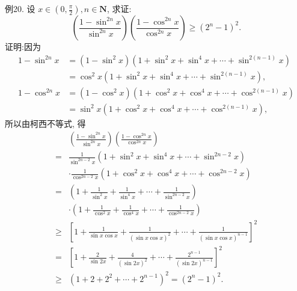 例20. 设 $x \in\left(0, \frac{\pi}{2}\right), n \in \mathbf{N}$, 求证:
$$
\left(\frac{1-\sin ^{2 n} x}{\sin ^{2 n} x}\right)\left(\frac{1-\cos ^{2 n} x}{\cos ^{2 n} x}\right) \geqslant\left(2^n-1\right)^2 .
$$
证明:因为
$$
\begin{aligned}
1-\sin ^{2 n} x & =\left(1-\sin ^2 x\right)\left(1+\sin ^2 x+\sin ^4 x+\cdots+\sin ^{2(n-1)} x\right) \\
& =\cos ^2 x\left(1+\sin ^2 x+\sin ^4 x+\cdots+\sin ^{2(n-1)} x\right), \\
1-\cos ^{2 n} x & =\left(1-\cos ^2 x\right)\left(1+\cos ^2 x+\cos ^4 x+\cdots+\cos ^{2(n-1)} x\right) \\
& =\sin ^2 x\left(1+\cos ^2 x+\cos ^4 x+\cdots+\cos ^{2(n-1)} x\right),
\end{aligned}
$$
所以由柯西不等式, 得
$$
\begin{aligned}
& \left(\frac{1-\sin ^{2 n} x}{\sin ^{2 n} x}\right)\left(\frac{1-\cos ^{2 n} x}{\cos ^{2 n} x}\right) \\
= & \frac{1}{\sin ^{2 n-2} x}\left(1+\sin ^2 x+\sin ^4 x+\cdots+\sin ^{2 n-2} x\right) \\
& \cdot \frac{1}{\cos ^{2 n-2} x}\left(1+\cos ^2 x+\cos ^4 x+\cdots+\cos ^{2 n-2} x\right) \\
= & \left(1+\frac{1}{\sin ^2 x}+\frac{1}{\sin ^4 x}+\cdots+\frac{1}{\sin ^{2 n-2} x}\right) \\
& \cdot\left(1+\frac{1}{\cos ^2 x}+\frac{1}{\cos ^4 x}+\cdots+\frac{1}{\cos ^{2 n-2} x}\right) \\
\geqslant & {\left[1+\frac{1}{\sin x \cos x}+\frac{1}{(\sin x \cos x)^2}+\cdots+\frac{1}{(\sin x \cos x)^{n-1}}\right]^2 } \\
= & {\left[1+\frac{2}{\sin 2 x}+\frac{4}{(\sin 2 x)^2}+\cdots+\frac{2^{n-1}}{(\sin 2 x)^{n-1}}\right]^2 } \\
\geqslant & \left(1+2+2^2+\cdots+2^{n-1}\right)^2=\left(2^n-1\right)^2 .
\end{aligned}
$$



